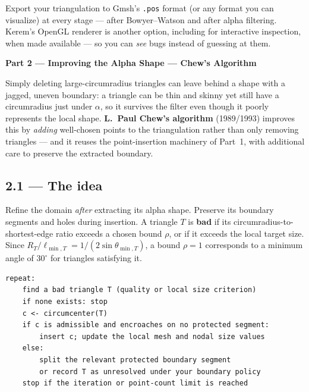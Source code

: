 \documentclass[11pt,a4paper]{article}
\newcommand{\homeworkpart}[2]{%
  \vspace{0.6em}
  \begin{tcolorbox}[colback=navy,colframe=navy,arc=0pt,boxrule=0pt,
    left=10pt,right=10pt,top=7pt,bottom=7pt]
    {\color{white}\bfseries\large Part #1 --- #2}
  \end{tcolorbox}
  \vspace{0.4em}
}
\begin{document}
\begin{note}
Export your triangulation to Gmsh's \texttt{.pos} format (or any format you
can visualize) at every stage --- after Bowyer--Watson and after alpha
filtering. Kerem's OpenGL renderer is another option, including for
interactive inspection, when made available --- so you can \emph{see} bugs instead of guessing at them.
\end{note}

\homeworkpart{2}{Improving the Alpha Shape --- Chew's Algorithm}

Simply deleting large-circumradius triangles can leave behind a shape with a
jagged, uneven boundary: a triangle can be thin and skinny yet still have a
circumradius just under $\alpha$, so it survives the filter even though it
poorly represents the local shape. \textbf{L.~Paul Chew's algorithm}
(1989/1993) improves this by \emph{adding} well-chosen points to the
triangulation rather than only removing triangles --- and it reuses the point-insertion machinery of Part~1, with
additional care to preserve the extracted boundary.

\subsection*{2.1 --- The idea}

Refine the domain \emph{after} extracting its alpha shape. Preserve its
boundary segments and holes during insertion. A triangle $T$ is
\textbf{bad} if its circumradius-to-shortest-edge ratio exceeds a chosen
bound $\rho$, or if it exceeds the local target size. Since
$R_T/\ell_{\min,T}=1/(2\sin\theta_{\min,T})$, a bound $\rho=1$ corresponds
to a minimum angle of $30^\circ$ for triangles satisfying it.

\begin{lstlisting}[style=code,caption={Boundary-preserving refinement},captionpos=b]
repeat:
    find a bad triangle T (quality or local size criterion)
    if none exists: stop
    c <- circumcenter(T)
    if c is admissible and encroaches on no protected segment:
        insert c; update the local mesh and nodal size values
    else:
        split the relevant protected boundary segment
        or record T as unresolved under your boundary policy
    stop if the iteration or point-count limit is reached
\end{lstlisting}
\end{document}
